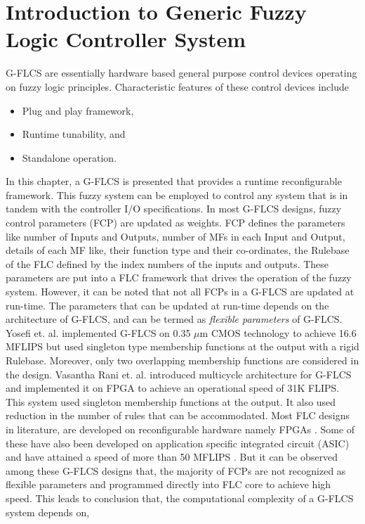 \section{Introduction to Generic Fuzzy Logic Controller System} \label{sec:ch2-GFLC}
\par
G\hyp{}FLCS are essentially hardware based general purpose control devices operating on fuzzy logic principles. Characteristic features of these control devices include
\begin{itemize}
	\item Plug and play framework,
	\item Runtime tunability, and
	\item Standalone operation.
\end{itemize}
\par
In this chapter, a G\hyp{}FLCS is presented that provides a runtime reconfigurable framework. This fuzzy system can be employed to control any system that is in tandem with the controller I/O specifications. In most G\hyp{}FLCS designs, fuzzy control parameters (FCP) are updated as weights. FCP defines the parameters like number of Inputs and Outputs, number of MFs in each Input and Output, details of each MF like, their function type and their co-ordinates, the Rulebase of the FLC defined by the index numbers of the inputs and outputs. These parameters are put into a FLC framework that drives the operation of the fuzzy system. However, it can be noted that not all FCPs in a G\hyp{}FLCS are updated at run-time. The parameters that can be updated at run-time depends on the architecture of G\hyp{}FLCS, and can be termed as \textit{flexible parameters} of G\hyp{}FLCS. Yosefi et. al. \cite{Yosefi2007,Yosefi2011} implemented G\hyp{}FLCS on 0.35 $ \mu $m CMOS technology to achieve 16.6 MFLIPS but used singleton type membership functions at the output with a rigid Rulebase. Moreover, only two overlapping membership functions are considered in the design. Vasantha Rani et. al. \cite{VasanthaRani2005} introduced multicycle architecture for G\hyp{}FLCS and implemented it on FPGA to achieve an operational speed of 31K FLIPS. This system used singleton membership functions at the output. It also used reduction in the number of rules that can be accommodated. Most FLC designs in literature, are developed on reconfigurable hardware namely FPGAs \cite{Messai2011a,Brox2013,Adhavan2014a}. Some of these have also been developed on application specific integrated circuit (ASIC) and have attained a speed of more than 50 MFLIPS \cite{Bosque2014b,Zavala2012}. But it can be observed among these G\hyp{}FLCS designs that, the majority of FCPs are not recognized as flexible parameters and programmed directly into FLC core to achieve high speed. This leads to conclusion that, the computational complexity of a G\hyp{}FLCS system depends on,

